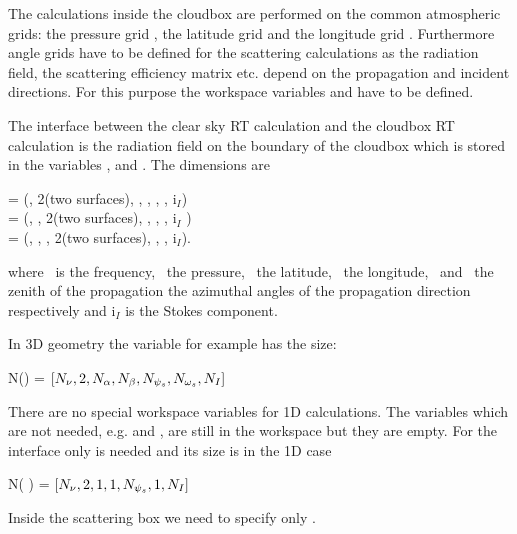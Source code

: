 The calculations inside the cloudbox are performed on the common 
atmospheric grids: the pressure grid
, the latitude grid  
and the longitude grid . 
Furthermore angle grids have to be defined for the scattering calculations  
as the radiation field, the scattering efficiency matrix etc. depend
on the propagation and incident directions. For this purpose  the workspace  
variables  and 
have to be defined.

The interface between the clear sky RT calculation and the cloudbox RT
calculation is the radiation field on the boundary of the cloudbox
which is stored
in the variables ,  and
. The dimensions are 
\begin{center}
   =  (\Frq, 2(two surfaces), \Lat, \Lon, \ScaZa, \ScaAa, i$_I$)\\
  =  (\Frq, \Prs, 2(two surfaces), \Lon, \ScaZa,
\ScaAa, i$_I$ )\\
  =  (\Frq, \Prs, \Lat, 2(two surfaces), \ScaZa,
\ScaAa, i$_I$).
\end{center}
where \Frq\ is the frequency, \Prs\ the pressure, \Lat\ the latitude,
\Lon\ the longitude, \ScaZa\ and \ScaAa\  the zenith of the propagation
the azimuthal angles of the propagation direction respectively and
i$_I$ is the Stokes component. 

In 3D geometry the variable   for example has the
size:
\begin{center}
  N() = $[N_{\nu}, 2, N_{\alpha}, N_{\beta}, N_{{\psi_s}},
  N_{{\omega_s}}, N_I]$
\end{center}  


There are no special workspace variables for 1D calculations. The
variables which are not needed, e.g.  and
, are still in the workspace but they are
empty. For the interface only  is needed and its
size is in the 1D case
\begin{center}
N(  ) = $[N_{\nu}, 2, 1, 1,  N_{{\psi_s}}, 1,  N_I]$
\end{center}  
Inside the scattering box we need to specify only  
. 

